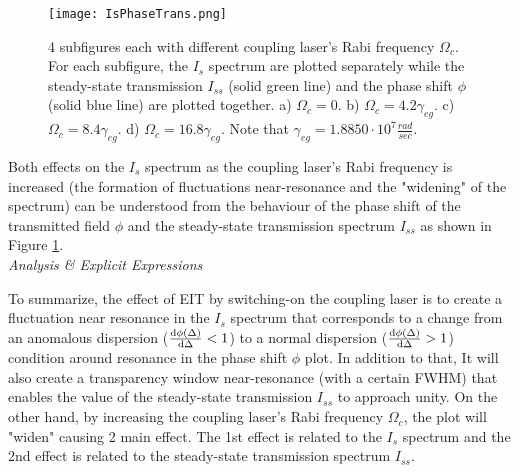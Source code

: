\begin{figure}[h!]
    \centering
    \texttt{[image: IsPhaseTrans.png]}
    \caption{4 subfigures each with different coupling laser's Rabi frequency $\Omega_{c}$. For each subfigure, the $I_{s}$ spectrum are plotted separately while the steady-state transmission $I_{ss}$ (solid green line) and the phase shift $\phi$ (solid blue line) are plotted together. a) $\Omega_{c} = 0$. b) $\Omega_{c} = 4.2\gamma_{eg}$. c) $\Omega_{c} = 8.4\gamma_{eg}$. d) $\Omega_{c} = 16.8\gamma_{eg}$. Note that $\gamma_{eg} = 1.8850 \cdot 10^{7} \frac{rad}{sec}$.}
    \label{fig: Is compared to transmission & phase shift}
\end{figure}

Both effects on the $I_{s}$ spectrum as the coupling laser's Rabi frequency is increased (the formation of fluctuations near-resonance and the "widening" of the spectrum) can be understood from the behaviour of the phase shift of the transmitted field $\phi$ and the steady-state transmission spectrum $I_{ss}$ as shown in Figure \ref{fig: Is compared to transmission & phase shift}.\\

\textit{Analysis & Explicit Expressions}

To summarize, the effect of EIT by switching-on the coupling laser is to create a fluctuation near resonance in the $I_{s}$ spectrum that corresponds to a change from an anomalous dispersion ($\dv{\phi(\Delta)}{\Delta} < 1$) to a normal dispersion ($\dv{\phi(\Delta)}{\Delta} > 1$) condition around resonance in the phase shift $\phi$ plot. In addition to that, It will also create a transparency window near-resonance (with a certain FWHM) that enables the value of the steady-state transmission $I_{ss}$ to approach unity. On the other hand, by increasing the coupling laser's Rabi frequency $\Omega_{c}$, the plot will "widen" causing 2 main effect. The 1st effect is related to the $I_{s}$ spectrum and the 2nd effect is related to the steady-state transmission spectrum $I_{ss}$.\\

